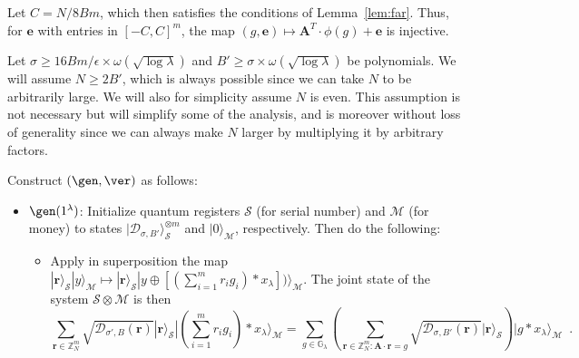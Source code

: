 \documentclass{article}\usepackage[a4paper,margin=20mm]{geometry}
\numberwithin{theorem}{section}
\numberwithin{equation}{section}
\newcommand{\Z}{\mathbb{Z}}
\newcommand{\G}{\mathbb{G}}
\newcommand{\ev}{{\mathbf{e}}}
\newcommand{\rv}{{\mathbf{r}}}
\newcommand{\Am}{{\mathbf{A}}}
\newcommand{\Ds}{{\mathcal{D}}}
\newcommand{\Ms}{{\mathcal{M}}}
\newcommand{\Ss}{{\mathcal{S}}}
\begin{document}
Let $C= N/8Bm$, which then satisfies the conditions of Lemma~\ref{lem:far}. Thus, for $\ev$ with entries in $[-C,C]^m$, the map $(g,\ev)\mapsto\Am^T\cdot\phi(g)+\ev$ is injective.

Let $\sigma\geq 16Bm/\epsilon\times\omega(\sqrt{\log\lambda})$ and $B'\geq \sigma\times\omega(\sqrt{\log\lambda})$ be polynomials. We will assume $N\geq 2B'$, which is always possible since we can take $N$ to be arbitrarily large. We will also for simplicity assume $N$ is even. This assumption is not necessary but will simplify some of the analysis, and is moreover without loss of generality since we can always make $N$ larger by multiplying it by arbitrary factors.

\begin{construction}\label{constr:alt} Construct $(\gen,\ver)$ as follows:
	\begin{itemize}
		\item $\gen(1^\lambda)$: Initialize quantum registers $\Ss$ (for serial number) and $\Ms$ (for money) to states $|\Ds_{\sigma,B'}\rangle^{\otimes m}_\Ss$ and $|0\rangle_\Ms$, respectively. Then do the following:
		\begin{itemize}
			\item Apply in superposition the map $|\rv\rangle_\Ss|y\rangle_\Ms\mapsto |\rv\rangle_\Ss|y\oplus [(\sum_{i=1}^m r_i g_i)*x_\lambda])\rangle_\Ms$. The joint state of the system $\Ss\otimes\Ms$ is then \[\sum_{\rv\in\Z_N^m}\sqrt{\Ds_{\sigma',B}(\rv)}|\rv\rangle_\Ss|(\sum_{i=1}^m r_i g_i)*x_\lambda\rangle_\Ms=\sum_{g\in\G_\lambda}\left(\sum_{\rv\in\Z_N^m:\Am\cdot\rv=g}\sqrt{\Ds_{\sigma,B'}(\rv)}|\rv\rangle_\Ss\right)|g*x_\lambda\rangle_\Ms\enspace .\]
			

\end{itemize}
\end{itemize}
\end{construction}
\end{document}
